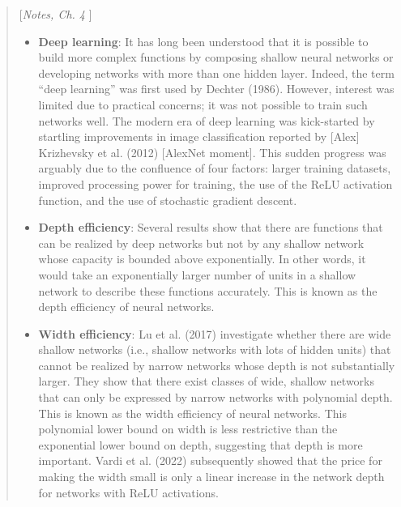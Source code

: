 \documentclass{myclass}
\numberwithin{equation}{subsection}
\begin{document}
\begin{quote}[\textit{Notes, Ch. 4} \cite{prince2023understanding}]
\begin{itemize}
\item \textbf{Deep learning}: It has long been understood that it is possible to build more complex
functions by composing shallow neural networks or developing networks with more than one hidden
layer. Indeed, the term “deep learning” was first used by Dechter (1986). However, interest was
limited due to practical concerns; it was not possible to train such networks well. The modern era
of deep learning was kick-started by startling improvements in image classification reported by
[Alex] Krizhevsky et al. (2012) [AlexNet moment]. This sudden progress was arguably due to the
confluence of four factors: larger training datasets, improved processing power for training, the
use of the ReLU activation function, and the use of stochastic gradient descent.

\item \textbf{Depth efficiency}: Several results show that there are functions that can be realized
by deep networks but not by any shallow network whose capacity is bounded above exponentially. In
other words, it would take an exponentially larger number of units in a shallow network to describe
these functions accurately. This is known as the depth efficiency of neural networks.

\item \textbf{Width efficiency}: Lu et al. (2017) investigate whether there are wide shallow
networks (i.e., shallow networks with lots of hidden units) that cannot be realized by narrow
networks whose depth is not substantially larger. They show that there exist classes of wide,
shallow networks that can only be expressed by narrow networks with polynomial depth. This is known
as the width efficiency of neural networks. This polynomial lower bound on width is less restrictive
than the exponential lower bound on depth, suggesting that depth is more important. Vardi et al.
(2022) subsequently showed that the price for making the width small is only a linear increase in
the network depth for networks with ReLU activations.
\end{itemize}
\end{quote}







\end{document}
